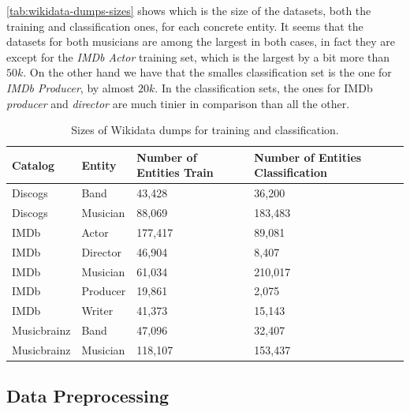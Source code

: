 \documentclass[epsfig,a4paper,11pt,titlepage,twoside,openany]{book}
\begin{document}
\autoref{tab:wikidata-dumps-sizes} shows which is the size of the datasets, both the training and classification ones, for each concrete entity. It seems that the datasets for both musicians are among the largest in both cases, in fact they are except for the \textit{IMDb Actor} training set, which is the largest by a bit more than $50k$. On the other hand we have that the smalles classification set is the one for \textit{IMDb Producer}, by almost $20k$. In the classification sets, the ones for IMDb \textit{producer} and \textit{director} are much tinier in comparison than all the other. 

\begin{table}[H]
\centering
\begin{tabular}{l|l|l|l}
\textbf{Catalog}     & \textbf{Entity}   & \textbf{Number of Entities Train} & \textbf{Number of Entities Classification} \\ \hline
Discogs     & Band     & 43,428                   & 36,200                            \\ \hline
Discogs     & Musician & 88,069                   & 183,483                           \\ \hline
IMDb        & Actor    & 177,417                  & 89,081                            \\ \hline
IMDb        & Director & 46,904                   & 8,407                             \\ \hline
IMDb        & Musician & 61,034                   & 210,017                           \\ \hline
IMDb        & Producer & 19,861                   & 2,075                             \\ \hline
IMDb        & Writer   & 41,373                   & 15,143                            \\ \hline
Musicbrainz & Band     & 47,096                   & 32,407                            \\ \hline
Musicbrainz & Musician & 118,107                  & 153,437                           \\ \hline
\end{tabular}
\caption{Sizes of Wikidata dumps for training and classification.}
\label{tab:wikidata-dumps-sizes}
\end{table}



\subsection{Data Preprocessing}
\label{sec:data-preprocessing}
\end{document}
